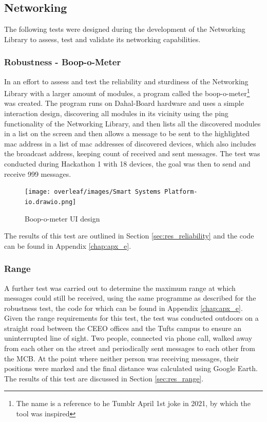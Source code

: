 \subsection{\label{sec:methods_test_net}Networking}
The following tests were designed during the development of the Networking Library to assess, test and validate its networking capabilities.

\subsubsection{\label{sec:methods_test_boop}Robustness - Boop-o-Meter}
In an effort to assess and test the reliability and sturdiness of the Networking Library with a larger amount of modules, a program called the boop-o-meter\footnote{The name is a reference to he Tumblr April 1st joke in 2021, by which the tool was inspired} was created. The program runs on Dahal-Board hardware and uses a simple interaction design, discovering all modules in its vicinity using the ping functionality of the Networking Library, and then lists all the discovered modules in a list on the screen and then allows a message to be sent to the highlighted mac address in a list of mac addresses of discovered devices, which also includes the broadcast address, keeping count of received and sent messages. The test was conducted during Hackathon 1 with 18 devices, the goal was then to send and receive 999 messages.

\begin{figure}[H]
    \centering
    \texttt{[image: overleaf/images/Smart Systems Platform-io.drawio.png]}
    \vspace{\ftspace}
    \caption{Boop-o-meter UI design}
    \label{fig:boop-o-meter}
\end{figure}

The results of this test are outlined in Section \ref{sec:res_reliability} and the code can be found in Appendix \ref{chap:apx_e}.

\subsubsection{\label{sec:methods_test_range}Range}
A further test was carried out to determine the maximum range at which messages could still be received, using the same programme as described for the robustness test, the code for which can be found in Appendix \ref{chap:apx_e}. Given the range requirements for this test, the test was conducted outdoors on a straight road between the CEEO offices and the Tufts campus to ensure an uninterrupted line of sight. 
Two people, connected via phone call, walked away from each other on the street and periodically sent messages to each other from the MCB. At the point where neither person was receiving messages, their positions were marked and the final distance was calculated using Google Earth. The results of this test are discussed in Section \ref{sec:res_range}.

